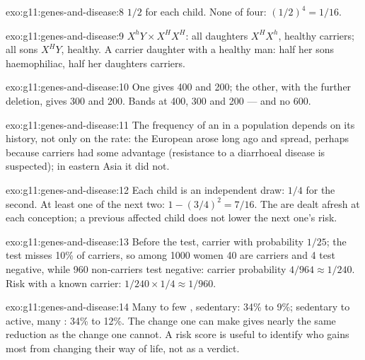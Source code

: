\begin{solution}{exo:g11:genes-and-disease:8}
$1/2$ for each child. None of four: $(1/2)^4 = 1/16$.
\end{solution}

\begin{solution}{exo:g11:genes-and-disease:9}
$X^hY \times X^HX^H$: all daughters $X^HX^h$, healthy carriers; all
sons $X^HY$, healthy. A carrier daughter with a healthy man: half her
sons haemophiliac, half her daughters carriers.
\end{solution}

\begin{solution}{exo:g11:genes-and-disease:10}
One  gives 400 and 200; the other, with the further deletion,
gives 300 and 200. Bands at 400, 300 and 200 --- and no 600.
\end{solution}

\begin{solution}{exo:g11:genes-and-disease:11}
The frequency of an  in a population depends on its history,
not only on the  rate: the European  arose long ago and
spread, perhaps because carriers had some advantage (resistance to a
diarrhoeal disease is suspected); in eastern Asia it did not.
\end{solution}

\begin{solution}{exo:g11:genes-and-disease:12}
Each child is an independent draw: $1/4$ for the second. At least one
of the next two: $1 - (3/4)^2 = 7/16$. The  are dealt afresh
at each conception; a previous affected child does not lower the
next one's risk.
\end{solution}

\begin{solution}{exo:g11:genes-and-disease:13}
Before the test, carrier with probability $1/25$; the test misses
10\% of carriers, so among 1000 women 40 are carriers and 4 test
negative, while 960 non-carriers test negative: carrier probability
$4/964 \approx 1/240$. Risk with a known carrier: $1/240 \times 1/4
\approx 1/960$.
\end{solution}

\begin{solution}{exo:g11:genes-and-disease:14}
Many to few , sedentary: 34\% to 9\%; sedentary to active, many
: 34\% to 12\%. The change one can make gives nearly the same
reduction as the change one cannot. A risk score is useful to
identify who gains most from changing their way of life, not as a
verdict.
\end{solution}

